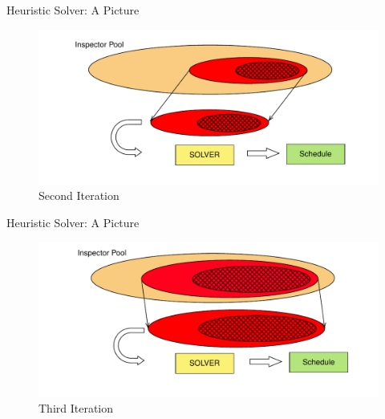 \documentclass[handout]{beamer}
\begin{document}
\begin{frame}{Heuristic Solver: A Picture}
    \begin{figure}
        \centering
        \includegraphics[scale=0.7]{iter2.pdf}
        \caption{Second Iteration}
        \label{fig:my_label}
    \end{figure}
\end{frame}

\begin{frame}{Heuristic Solver: A Picture}
    \begin{figure}
        \centering
        \includegraphics[scale=0.7]{iter3.pdf}
        \caption{Third Iteration}
        \label{fig:my_label}
    \end{figure}
\end{frame}

\end{document}
